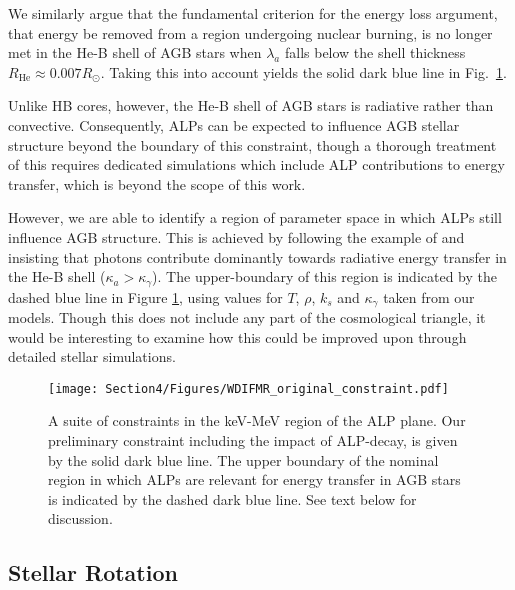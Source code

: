 We similarly argue that the fundamental criterion for the energy loss argument, that energy be removed from a region undergoing nuclear burning, is no longer met in the He-B shell of AGB stars when $\lambda_a$ falls below the shell thickness $R_{\mathrm{He}}\approx0.007R_{\odot}$. Taking this into account yields the solid dark blue line in Fig.~\ref{fig: ALP-IFMR Constraint}.




Unlike HB cores, however, the He-B shell of AGB stars is radiative rather than convective. Consequently, ALPs can be expected to influence AGB stellar structure beyond the boundary of this constraint, though a thorough treatment of this requires dedicated simulations which include ALP contributions to energy transfer, which is beyond the scope of this work.


However, we are able to identify a region of parameter space in which ALPs still influence AGB structure. This is achieved by following the example of \cite{Raffelt_Energy_Transfer} and insisting that photons contribute dominantly towards radiative energy transfer in the He-B shell ($\kappa_a>\kappa_{\gamma}$). The upper-boundary of this region is indicated by the dashed blue line in Figure \ref{fig: ALP-IFMR Constraint}, using values for $T$, $\rho$, $k_s$ and $\kappa_{\gamma}$ taken from our models. Though this does not include any part of the cosmological triangle, it would be interesting to examine how this could be improved upon through detailed stellar simulations.
\begin{figure}[t]
    \centering
    \texttt{[image: Section4/Figures/WDIFMR\_original\_constraint.pdf]}
    \caption{A suite of constraints in the keV-MeV region of the ALP plane. Our preliminary constraint including the impact of ALP-decay, is given by the solid dark blue line. The upper boundary of the nominal region in which ALPs are relevant for energy transfer in AGB stars is indicated by the dashed dark blue line. See text below for discussion.}
    \label{fig: ALP-IFMR Constraint}
\end{figure}






\subsection{Stellar Rotation}
\label{subsec: rotn}

